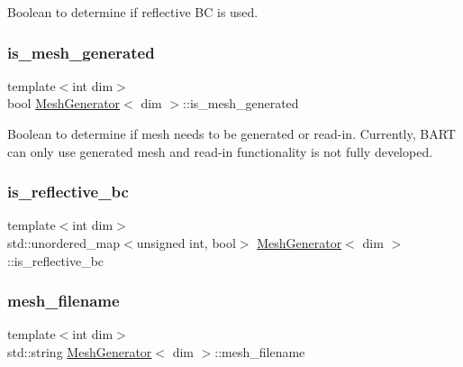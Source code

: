 Boolean to determine if reflective BC is used. 

\mbox{\label{class_mesh_generator_ad2e8abde741e4c291741cf4ee790e0e2}} 
\subsubsection{\texorpdfstring{is\+\_\+mesh\+\_\+generated}{is\_mesh\_generated}}
{\footnotesize\ttfamily template$<$int dim$>$ \\
bool \hyperlink{class_mesh_generator}{Mesh\+Generator}$<$ dim $>$\+::is\+\_\+mesh\+\_\+generated\hspace{0.3cm}{\ttfamily [private]}}

Boolean to determine if mesh needs to be generated or read-\/in. Currently, B\+A\+RT can only use generated mesh and read-\/in functionality is not fully developed. \mbox{\label{class_mesh_generator_a5a6820b74d7cef07596e1d28a8bad8aa}} 
\subsubsection{\texorpdfstring{is\+\_\+reflective\+\_\+bc}{is\_reflective\_bc}}
{\footnotesize\ttfamily template$<$int dim$>$ \\
std\+::unordered\+\_\+map$<$unsigned int, bool$>$ \hyperlink{class_mesh_generator}{Mesh\+Generator}$<$ dim $>$\+::is\+\_\+reflective\+\_\+bc\hspace{0.3cm}{\ttfamily [private]}}

\mbox{\label{class_mesh_generator_a1b283d2ba59b1719cab8dd191e72508a}} 
\subsubsection{\texorpdfstring{mesh\+\_\+filename}{mesh\_filename}}
{\footnotesize\ttfamily template$<$int dim$>$ \\
std\+::string \hyperlink{class_mesh_generator}{Mesh\+Generator}$<$ dim $>$\+::mesh\+\_\+filename\hspace{0.3cm}{\ttfamily [private]}}



